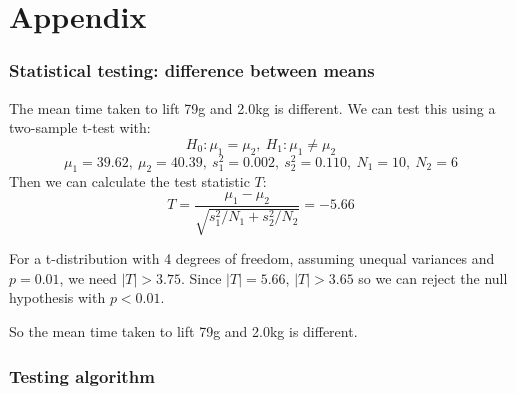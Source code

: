 \documentclass{beamer}
\begin{document}
\section{Appendix}
\begin{frame}
  \frametitle{Statistical testing: difference between means}
  The mean time taken to lift 79g and 2.0kg is different. We can test this using a two-sample t-test with:
  $$H_0: \mu_1 = \mu_2,\ H_1: \mu_1 \neq \mu_2 $$
  $$ \mu_1 = 39.62,\ \mu_2 = 40.39,\ s^2_1 = 0.002,\ s^2_2 = 0.110,\ N_1 = 10,\ N_2 = 6$$
  Then we can calculate the test statistic $T$:
  $$T = \frac{\mu_1 - \mu_2}{\sqrt{s^2_1 / N_1 + s^2_2 / N_2}} = -5.66$$

  For a t-distribution with 4 degrees of freedom, assuming unequal variances and $p = 0.01$, we need $|T| > 3.75$. Since $|T| = 5.66$, $|T| > 3.65$ so we can reject the null hypothesis with $p < 0.01$.

  So the mean time taken to lift 79g and 2.0kg is different. 
\end{frame}

\begin{frame}
  \frametitle{Testing algorithm}
  \begin{algorithm}[H]
  \end{algorithm}
\end{frame}
\end{document}
